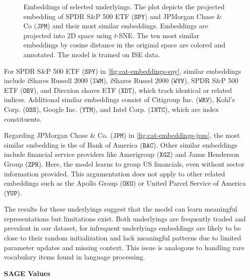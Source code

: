 \begin{figure}[h!]
    \vfill
    \caption[Embeddings of Selected Underlyings]{Embeddings of selected underlyings. The plot depicts the projected embedding of SPDR S\&P 500 ETF ($\mathtt{SPY}$) and JPMorgan Chase \& Co ($\mathtt{JPM}$) and their most similar embeddings. Embeddings are projected into 2D space using $t$-SNE. The ten most similar embeddings by cosine distance in the original space are colored and annotated. The model is trained on \gls{ISE} data.}
    \label{fig:categorical-embeddings}
\end{figure}

For SPDR S\&P 500 ETF ($\mathtt{SPY}$) in \cref{fig:cat-embeddings-spy}, similar embeddings include iShares Russell 2000 ($\mathtt{IWM}$), iShares Russel 2000 ($\mathtt{WYV}$), SPDR S\&P 500 ETF ($\mathtt{OBV}$), and Direxion shares ETF ($\mathtt{XDT}$), which track identical or related indices. Additional similar embeddings consist of Citigroup Inc. ($\mathtt{WRV}$), Kohl's Corp. ($\mathtt{OSS}$), Google Inc. ($\mathtt{YTM}$), and Intel Corp. ($\mathtt{INTC}$), which are index constituents.

Regarding JPMorgan Chase \& Co. ($\mathtt{JPM}$) in \cref{fig:cat-embeddings-jpm}, the most similar embedding is the of Bank of America ($\mathtt{BAC}$). Other similar embeddings include financial service providers like Amerigroup ($\mathtt{XGZ}$) and Janus Henderson Group ($\mathtt{ZPR}$). Here, the model learns to group US financials, even without sector information provided. This argumentation does not apply to other related embeddings such as the Apollo Group ($\mathtt{OKO}$) or United Parcel Service of America ($\mathtt{YUP}$). 

The results for these underlyings suggest that the model can learn meaningful representations but limitations exist. Both underlyings are frequently traded and prevalent in our dataset, for infrequent underlyings embeddings are likely to be close to their random initialization and lack meaningful patterns due to limited parameter updates and missing context. This issue is analogous to handling rare vocabulary items found in language processing.

\textbf{SAGE Values}

